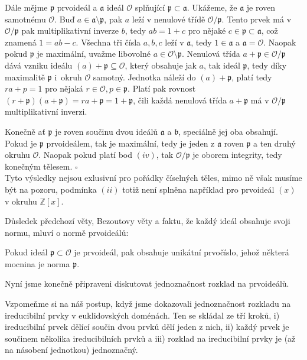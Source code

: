 \documentclass[12pt]{report}
\begin{document}
Dále mějme $\mathfrak{p}$ prvoideál a $\mathfrak{a}$ ideál $\mathcal{O}$ splňující $\mathfrak{p} \subset \mathfrak{a}$. Ukážeme, že $\mathfrak{a}$ je roven samotnému $\mathcal{O}$. Buď $a \in \mathfrak{a} \setminus \mathfrak{p}$, pak $a$ leží v nenulové třídě $\mathcal{O}/\mathfrak{p}$. Tento prvek má v $\mathcal{O}/\mathfrak{p}$ pak multiplikativní inverze $b$, tedy $ab=1+c$ pro nějaké $c \in \mathfrak{p} \subset \mathfrak{a}$, což znamená $1 = ab-c$. Všechna tři čísla $a,b,c$ leží v $\mathfrak{a}$, tedy $1 \in \mathfrak{a}$ a $\mathfrak{a} = \mathcal{O}$. Naopak pokud $\mathfrak{p}$ je maximální, uvažme libovolné $a \in \mathcal{O}\setminus\mathfrak{p}$. Nenulová třída $a+\mathfrak{p} \in \mathcal{O}/\mathfrak{p}$ dává vzniku ideálu $(a)+\mathfrak{p} \subseteq \mathcal{O}$, který obsahuje jak $a$, tak ideál $\mathfrak{p}$, tedy díky maximalitě $\mathfrak{p}$ i~okruh $\mathcal{O}$ samotný. Jednotka náleží do $(a)+\mathfrak{p}$, platí tedy $ra+p = 1$ pro nějaká $r \in \mathcal{O}, p \in \mathfrak{p}$. Platí pak rovnost $(r+\mathfrak{p})(a+\mathfrak{p}) = ra+\mathfrak{p} = 1+\mathfrak{p}$, čili každá nenulová třída $a+\mathfrak{p}$ má v $\mathcal{O}/\mathfrak{p}$ multiplikativní inverzi.

Konečně ať $\mathfrak{p}$ je roven součinu dvou ideálů $\mathfrak{a}$ a $\mathfrak{b}$, speciálně jej oba obsahují. Pokud je $\mathfrak{p}$ prvoideálem, tak je maximální, tedy je jeden z $\mathfrak{a}$ roven $\mathfrak{p}$ a ten druhý okruhu $\mathcal{O}$. Naopak pokud platí bod $(iv)$, tak $\mathcal{O}/\mathfrak{p}$ je oborem integrity, tedy konečným tělesem. \hfill $\square$\\


Tyto výsledky nejsou exlusivní pro pořádky číselných těles, mimo ně však musíme být na pozoru, podmínka $(ii)$ totiž není splněna například pro prvoideál $(x)$ v okruhu $\mathbb{Z}[x]$.

Důsledek předchozí věty, Bezoutovy věty a faktu, že každý ideál obsahuje svoji normu, mluví o normě prvoideálů:
\begin{dusledek}
Pokud ideál $\mathfrak{p} \subset \mathcal{O}$ je prvoideál, pak obsahuje unikátní prvočíslo, jehož některá mocnina je norma $\mathfrak{p}$.
\end{dusledek}

Nyní jsme konečně připraveni diskutovat jednoznačnost rozklad na prvoideálů.

Vzpomeňme si na náš postup, když jsme dokazovali jednoznačnost rozkladu na ireducibilní prvky v euklidovských doménách. Ten se skládal ze tří kroků, i)  ireducibilní prvek dělící součin dvou prvků dělí jeden z nich, ii) každý prvek je součinem několika ireducibilních prvků a iii) rozklad na ireducibilní prvky je (až na násobení jednotkou) jednoznačný.
\end{document}
